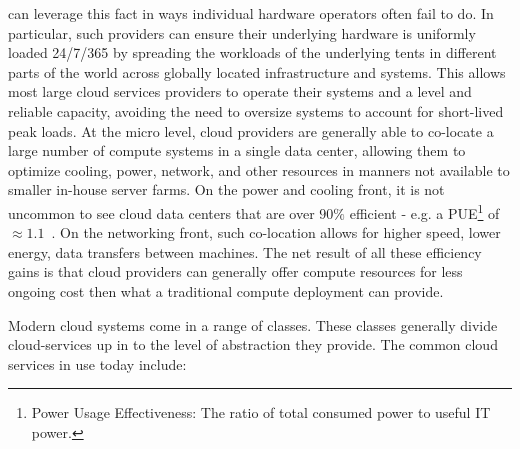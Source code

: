 \begin{packed_desc}
  can leverage this fact in ways individual hardware operators often
  fail to do. In particular, such providers can ensure their
  underlying hardware is uniformly loaded 24/7/365 by spreading the
  workloads of the underlying tents in different parts of the world
  across globally located infrastructure and systems. This allows most
  large cloud services providers to operate their systems and a level
  and reliable capacity, avoiding the need to oversize systems to
  account for short-lived peak loads. At the micro level, cloud
  providers are generally able to co-locate a large number of compute
  systems in a single data center, allowing them to optimize cooling,
  power, network, and other resources in manners not available to
  smaller in-house server farms. On the power and cooling front, it is
  not uncommon to see cloud data centers that are over $90\%$
  efficient - e.g. a PUE\footnote{Power Usage Effectiveness: The ratio
    of total consumed power to useful IT power.} of
  $\approx1.1$~\cite{google-efficiency}. On the networking front, such
  co-location allows for higher speed, lower energy, data transfers
  between machines. The net result of all these efficiency gains is
  that cloud providers can generally offer compute resources for less
  ongoing cost then what a traditional compute deployment can provide.
\end{packed_desc}

Modern cloud systems come in a range of classes. These classes
generally divide cloud-services up in to the level of abstraction they
provide. The common cloud services in use today include:

